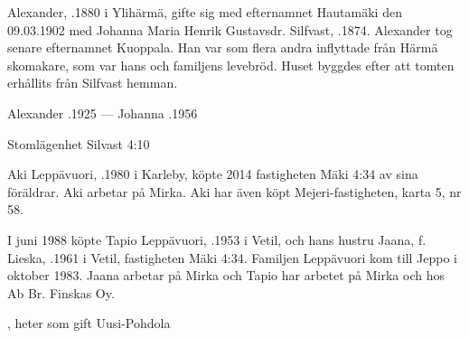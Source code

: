 %
Alexander, .1880 i Ylihärmä, gifte sig med efternamnet Hautamäki den 09.03.1902 med Johanna Maria Henrik Gustavsdr. Silfvast, .1874. Alexander tog senare efternamnet Kuoppala. Han var som flera andra inflyttade från Härmä skomakare, som var hans och familjens levebröd. Huset byggdes efter att tomten erhållits från Silfvast hemman.
\begin{jhchildren}
  \item {}
  \item {}
  \item {}
  \item {}
  \item {}
  \item {}
  \item {}
  \item {}
\end{jhchildren}

Alexander .1925  ---  Johanna .1956



%

Stomlägenhet Silvast 4:10


%
Aki Leppävuori, .1980 i Karleby, köpte 2014 fastigheten Mäki 4:34 av sina föräldrar. Aki arbetar på Mirka. Aki har även köpt Mejeri-fastigheten, karta 5, nr 58.\jhvspace{}


%
I juni 1988 köpte Tapio Leppävuori, .1953 i Vetil, och	hans hustru Jaana, f. Lieska, .1961 i Vetil, fastigheten Mäki 4:34. Familjen Leppävuori kom till Jeppo i oktober 1983. Jaana arbetar på Mirka och Tapio har arbetet på Mirka och hos Ab Br. Finskas Oy.
\begin{jhchildren}
  \item {}
  \item {}, heter som gift Uusi-Pohdola
\end{jhchildren}


